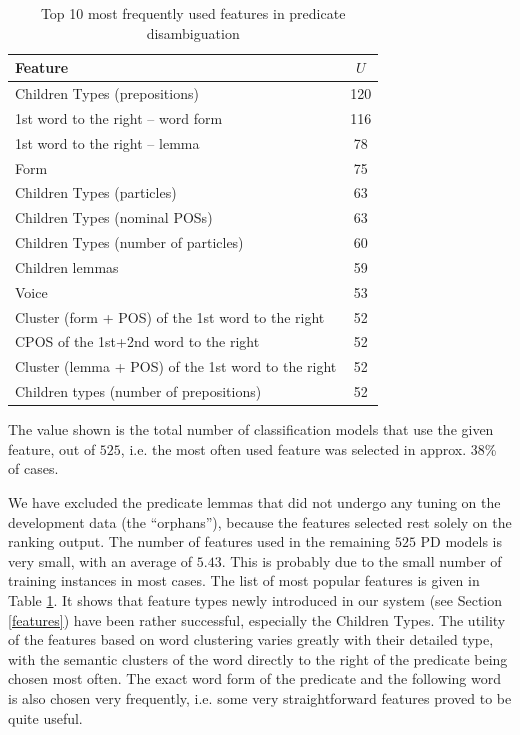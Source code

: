 \documentclass[12pt,notitlepage]{report}
\begin{document}
\begin{table}[tb]\footnotesize
\caption{Top 10 most frequently used features in predicate disambiguation}\label{tab:feats-pd}
\begin{center}
\begin{tabular}{|l|c|}\hline
\bf Feature & \bf $U$ \\\hline
Children Types (prepositions) & 120 \\
1st word to the right -- word form & 116 \\
1st word to the right -- lemma & 78 \\
Form & 75 \\
Children Types (particles) & 63 \\
Children Types (nominal POSs) & 63 \\
Children Types (number of particles) & 60 \\
Children lemmas & 59 \\
Voice & 53 \\
Cluster (form + POS) of the 1st word to the right & 52 \\
CPOS of the 1st+2nd word to the right & 52 \\
Cluster (lemma + POS) of the 1st word to the right & 52 \\
Children types (number of prepositions) & 52 \\\hline
\end{tabular}
\end{center}
The value shown is the total number of classification models that use the given feature, out of $525$, i.e. the most often used feature was selected in approx. 38\% of cases.
\end{table}

We have excluded the predicate lemmas that did not undergo any tuning on the development data (the ``orphans''), because the features selected rest solely on the ranking output. The number of features used in the remaining $525$ PD models is very small, with an average of $5.43$. This is probably due to the small number of training instances in most cases. The list of most popular features is given in Table \ref{tab:feats-pd}. It shows that feature types newly introduced in our system (see Section \ref{features}) have been rather successful, especially the Children Types. The utility of the features based on word clustering varies greatly with their detailed type, with the semantic clusters of the word directly to the right of the predicate being chosen most often. The exact word form of the predicate and the following word is also chosen very frequently, i.e. some very straightforward features proved to be quite useful.
\end{document}
